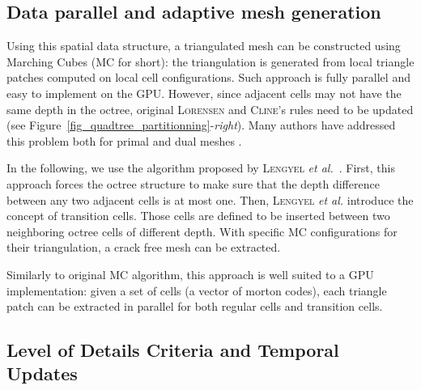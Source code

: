 \documentclass{llncs}
\begin{document}
\subsection{Data parallel and adaptive mesh generation}

Using this spatial data structure, a triangulated mesh can be constructed
using Marching Cubes \cite{lorensen1987marching} (MC for short): the
triangulation is generated from local triangle patches computed on
local cell configurations.
Such approach is fully parallel and easy to implement on the GPU.
However, since adjacent cells may not have the same depth
in the octree, original \textsc{Lorensen} and \textsc{Cline}'s rules need to be
updated (see Figure~\ref{fig_quadtree_partitionning}-\emph{right}).
Many authors have addressed this problem both for primal and
dual meshes
\cite{shu1995adaptive,schaefer2004dual,lengyel2010voxel,DBLP:journals/cgf/LewinerMPPL10,DBLP:journals/cvgip/LobelloDD14}.

In the following, we use the
algorithm
proposed by \textsc{Lengyel} \emph{et al.}~\cite{lengyel2010voxel}.
First, this approach forces the octree
structure
to make sure that the depth difference between any
two adjacent cells is at most one.
Then, \textsc{Lengyel} \emph{et al.} introduce the concept of transition cells.
Those cells are defined to be inserted between two neighboring octree cells of different depth.
With specific MC configurations for their triangulation, a crack free mesh can
be extracted.

Similarly to original MC algorithm, this approach is well suited %
to a GPU implementation: given a set of cells (a vector of morton codes),
each triangle patch can be extracted in parallel for both regular cells and transition cells.

\subsection{Level of Details Criteria and Temporal Updates}
\end{document}

